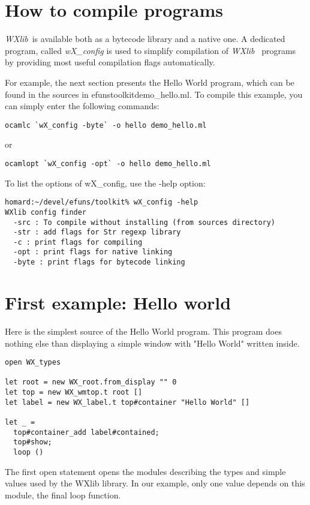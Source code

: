 \documentclass{report}
\newcommand{\wxlib}{\emph{WXlib}~}
\begin{document}
\section{How to compile programs}

 \wxlib is available both as a bytecode library and a native one. A dedicated
program, called \emph{wX\_config} is used to simplify compilation of \wxlib 
programs by providing most useful compilation flags automatically.

For example, the next section presents the Hello World program, which can 
be found in the sources in {\sf efuns\/toolkit\/demo\_hello.ml}. To compile this 
example, you can simply enter the following commands:

\begin{verbatim}
ocamlc `wX_config -byte` -o hello demo_hello.ml
\end{verbatim}
or
\begin{verbatim}
ocamlopt `wX_config -opt` -o hello demo_hello.ml
\end{verbatim}

  To list the options of wX\_config, use the -help option:

\begin{verbatim}
homard:~/devel/efuns/toolkit% wX_config -help
WXlib config finder
  -src : To compile without installing (from sources directory)
  -str : add flags for Str regexp library
  -c : print flags for compiling
  -opt : print flags for native linking
  -byte : print flags for bytecode linking
\end{verbatim}

\section{First example: Hello world}

 Here is the simplest source of the Hello World program. This program does 
nothing else than displaying a simple window with "Hello World" written 
inside.

\begin{verbatim}
open WX_types

let root = new WX_root.from_display "" 0
let top = new WX_wmtop.t root []
let label = new WX_label.t top#container "Hello World" []

let _ =
  top#container_add label#contained;
  top#show;
  loop ()
\end{verbatim}

 The first {\sf open} statement opens the modules describing the types and
simple values used by the WXlib library. In our example, only one value
depends on this module, the final {\sf loop} function.
\end{document}
